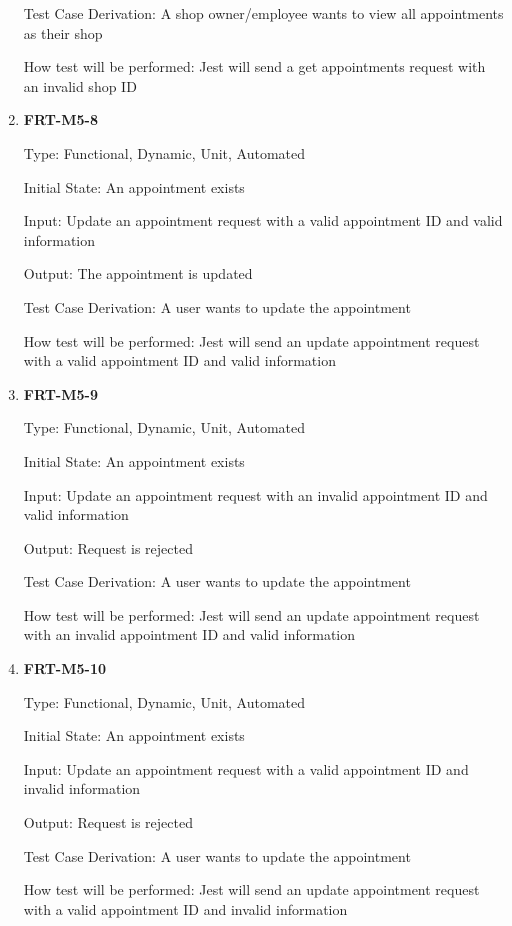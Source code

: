 \documentclass[12pt, titlepage]{article}
\begin{document}
\begin{enumerate}
	      Test Case Derivation: A shop owner/employee wants to view all appointments as their shop

	      How test will be performed: Jest will send a get appointments request with an invalid shop ID

	\item \textbf{FRT-M5-8}

	      Type: Functional, Dynamic, Unit, Automated

	      Initial State: An appointment exists

	      Input: Update an appointment request with a valid appointment ID and valid information

	      Output: The appointment is updated

	      Test Case Derivation: A user wants to update the appointment

	      How test will be performed: Jest will send an update appointment request with a valid appointment
	      ID and valid information

	\item \textbf{FRT-M5-9}

	      Type: Functional, Dynamic, Unit, Automated

	      Initial State: An appointment exists

	      Input: Update an appointment request with an invalid appointment ID and valid information

	      Output: Request is rejected

	      Test Case Derivation: A user wants to update the appointment

	      How test will be performed: Jest will send an update appointment request with an invalid
	      appointment ID and valid information

	\item \textbf{FRT-M5-10}

	      Type: Functional, Dynamic, Unit, Automated

	      Initial State: An appointment exists

	      Input: Update an appointment request with a valid appointment ID and invalid information

	      Output: Request is rejected

	      Test Case Derivation: A user wants to update the appointment

	      How test will be performed: Jest will send an update appointment request with a valid appointment
	      ID and invalid information


\end{enumerate}
\end{document}

